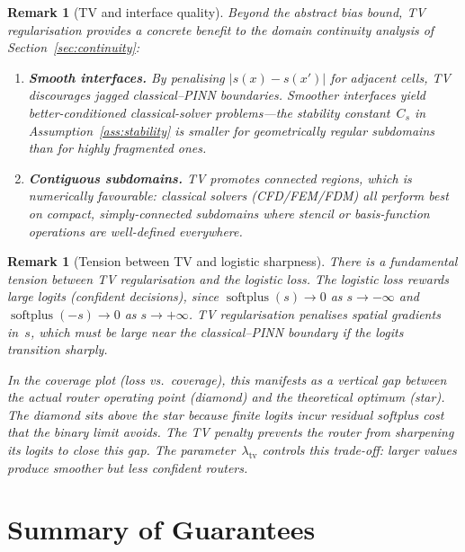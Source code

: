 \documentclass[11pt]{article}
\newtheorem{remark}[theorem]{Remark}
\DeclareMathOperator{\softplus}{softplus}
\begin{document}
\begin{remark}[TV and interface quality]\label{rem:tv-interface}
Beyond the abstract bias bound, TV regularisation provides a concrete benefit to the
domain continuity analysis of Section~\ref{sec:continuity}:
\begin{enumerate}
\item[(i)] \textbf{Smooth interfaces.}
  By penalising $|s(x) - s(x')|$ for adjacent cells, TV discourages jagged
  classical--PINN boundaries.  Smoother interfaces yield better-conditioned
  classical-solver problems---the stability constant~$C_s$ in
  Assumption~\ref{ass:stability} is smaller for geometrically regular subdomains
  than for highly fragmented ones.
\item[(ii)] \textbf{Contiguous subdomains.}
  TV promotes connected regions, which is numerically favourable: classical
  solvers (CFD/FEM/FDM) all perform best on compact, simply-connected subdomains
  where stencil or basis-function operations are well-defined everywhere.
\end{enumerate}
\end{remark}

\begin{remark}[Tension between TV and logistic sharpness]\label{rem:tension}
There is a fundamental tension between TV regularisation and the logistic loss.
The logistic loss rewards \emph{large} logits (confident decisions), since
$\softplus(s) \to 0$ as $s \to -\infty$ and $\softplus(-s) \to 0$ as $s \to +\infty$.
TV regularisation penalises \emph{spatial gradients} in~$s$, which must be large
near the classical--PINN boundary if the logits transition sharply.

In the coverage plot (loss vs.\ coverage), this manifests as a vertical gap between
the actual router operating point (diamond) and the theoretical optimum (star).
The diamond sits above the star because finite logits incur residual softplus cost
that the binary limit avoids.  The TV penalty prevents the router from sharpening its
logits to close this gap.  The parameter~$\lambda_{\mathrm{tv}}$ controls this
trade-off: larger values produce smoother but less confident routers.
\end{remark}

\section{Summary of Guarantees}
\label{sec:summary}
\end{document}
